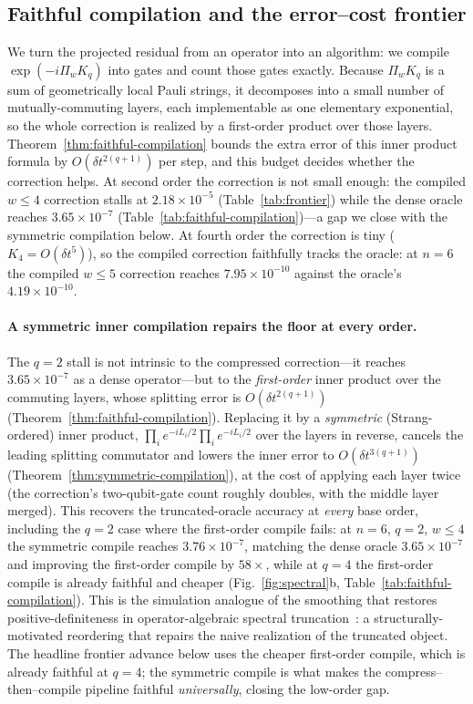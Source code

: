 \documentclass[aps,prxquantum,reprint,superscriptaddress,nofootinbib,amsmath,amssymb]{revtex4-2}
\newcommand{\dt}{\delta t}
\begin{document}


\subsection{Faithful compilation and the error--cost frontier}
\label{sec:frontier}

We turn the projected residual from an operator into an algorithm: we compile $\exp(-i\Pi_wK_q)$ into gates and count those gates exactly. Because $\Pi_wK_q$ is a sum of geometrically local Pauli strings, it decomposes into a small number of mutually-commuting layers, each implementable as one elementary exponential, so the whole correction is realized by a first-order product over those layers. Theorem~\ref{thm:faithful-compilation} bounds the extra error of this inner product formula by $O(\dt^{2(q+1)})$ per step, and this budget decides whether the correction helps. At second order the correction is not small enough: the compiled $w\leq4$ correction stalls at $2.18\times10^{-5}$ (Table~\ref{tab:frontier}) while the dense oracle reaches $3.65\times10^{-7}$ (Table~\ref{tab:faithful-compilation})---a gap we close with the symmetric compilation below. At fourth order the correction is tiny ($K_4=O(\dt^5)$), so the compiled correction faithfully tracks the oracle: at $n=6$ the compiled $w\leq5$ correction reaches $7.95\times10^{-10}$ against the oracle's $4.19\times10^{-10}$.

\paragraph{A symmetric inner compilation repairs the floor at every order.} The $q=2$ stall is not intrinsic to the compressed correction---it reaches $3.65\times10^{-7}$ as a dense operator---but to the \emph{first-order} inner product over the commuting layers, whose splitting error is $O(\dt^{2(q+1)})$ (Theorem~\ref{thm:faithful-compilation}). Replacing it by a \emph{symmetric} (Strang-ordered) inner product, $\prod_i e^{-iL_i/2}\prod_i e^{-iL_i/2}$ over the layers in reverse, cancels the leading splitting commutator and lowers the inner error to $O(\dt^{3(q+1)})$ (Theorem~\ref{thm:symmetric-compilation}), at the cost of applying each layer twice (the correction's two-qubit-gate count roughly doubles, with the middle layer merged). This recovers the truncated-oracle accuracy at \emph{every} base order, including the $q=2$ case where the first-order compile fails: at $n=6$, $q=2$, $w\le4$ the symmetric compile reaches $3.76\times10^{-7}$, matching the dense oracle $3.65\times10^{-7}$ and improving the first-order compile by $58\times$, while at $q=4$ the first-order compile is already faithful and cheaper (Fig.~\ref{fig:spectral}b, Table~\ref{tab:faithful-compilation}). This is the simulation analogue of the smoothing that restores positive-definiteness in operator-algebraic spectral truncation~\cite{hashimoto2024spectral}: a structurally-motivated reordering that repairs the naive realization of the truncated object. The headline frontier advance below uses the cheaper first-order compile, which is already faithful at $q=4$; the symmetric compile is what makes the compress--then--compile pipeline faithful \emph{universally}, closing the low-order gap.
\end{document}
